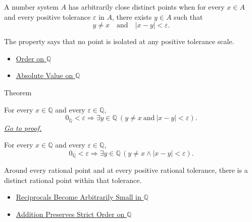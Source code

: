 \begin{remark*}
A number system $A$ has arbitrarily close distinct points when for every
$x\in A$ and every positive tolerance $\varepsilon$ in $A$, there exists
$y\in A$ such that
\[
y\ne x\quad\text{and}\quad |x-y|<\varepsilon.
\]
\end{remark*}

\begin{remark*}[Interpretation]
The property says that no point is isolated at any positive tolerance scale.
\end{remark*}

\begin{dependencies}
\begin{itemize}
  \item \hyperref[def:order-on-q]{Order on $\mathbb{Q}$}
  \item \hyperref[def:absolute-value-on-q]{Absolute Value on $\mathbb{Q}$}
\end{itemize}
\end{dependencies}

\begin{theorembox}{Theorem}
\begin{theorem}
\label{thm:q-has-arbitrarily-close-distinct-points}
For every $x\in\mathbb{Q}$ and every $\varepsilon\in\mathbb{Q}$,
\[
0_{\mathbb{Q}}<\varepsilon
\Longrightarrow
\exists y\in\mathbb{Q}\ (y\ne x\ \text{and}\ |x-y|<\varepsilon).
\]
\hyperref[prf:q-has-arbitrarily-close-distinct-points]{\textit{Go to proof.}}
\end{theorem}
\end{theorembox}

\begin{remark*}
For every $x\in\mathbb{Q}$ and every $\varepsilon\in\mathbb{Q}$,
\[
0_{\mathbb{Q}}<\varepsilon
\Longrightarrow
\exists y\in\mathbb{Q}\,(y\ne x\land |x-y|<\varepsilon).
\]
\end{remark*}

\begin{remark*}[Interpretation]
Around every rational point and at every positive rational tolerance, there is
a distinct rational point within that tolerance.
\end{remark*}

\begin{dependencies}
\begin{itemize}
  \item \hyperref[cor:reciprocals-arbitrarily-small-q]{Reciprocals Become Arbitrarily Small in $\mathbb{Q}$}
  \item \hyperref[thm:addition-preserves-strict-order-on-q]{Addition Preserves Strict Order on $\mathbb{Q}$}
\end{itemize}
\end{dependencies}

